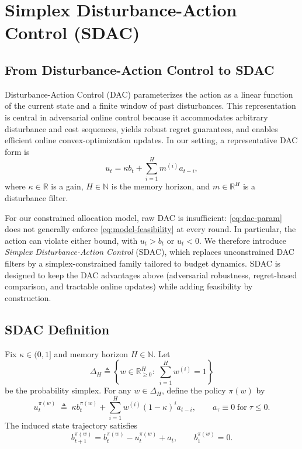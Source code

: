 \documentclass[11pt]{article}
\begin{document}
\section{Simplex Disturbance-Action Control (SDAC)}
\label{sec:sdac}

\subsection{From Disturbance-Action Control to SDAC}
Disturbance-Action Control (DAC) parameterizes the action as a linear function of the current state and a finite window of past disturbances. This representation is central in adversarial online control because it accommodates arbitrary disturbance and cost sequences, yields robust regret guarantees, and enables efficient online convex-optimization updates. In our setting, a representative DAC form is
\begin{equation}
\label{eq:dac-param}
u_t = \kappa b_t + \sum_{i=1}^{H} m^{(i)} a_{t-i},
\end{equation}
where $\kappa\in\mathbb{R}$ is a gain, $H\in\mathbb{N}$ is the memory horizon, and $m\in\mathbb{R}^H$ is a disturbance filter.

For our constrained allocation model, raw DAC is insufficient: \eqref{eq:dac-param} does not generally enforce \eqref{eq:model-feasibility} at every round. In particular, the action can violate either bound, with $u_t>b_t$ or $u_t<0$. We therefore introduce \emph{Simplex Disturbance-Action Control} (SDAC), which replaces unconstrained DAC filters by a simplex-constrained family tailored to budget dynamics. SDAC is designed to keep the DAC advantages above (adversarial robustness, regret-based comparison, and tractable online updates) while adding feasibility by construction.


\subsection{SDAC Definition}
Fix $\kappa\in(0,1]$ and memory horizon $H\in\mathbb{N}$. Let
\begin{equation}
\label{eq:def-simplex}
\Delta_H \triangleq \left\{w\in\mathbb{R}_{\ge 0}^H:\; \sum_{i=1}^H w^{(i)}=1\right\}
\end{equation}
be the probability simplex. For any $w\in\Delta_H$, define the policy $\pi(w)$ by
\begin{equation}
\label{eq:def-sdac-policy}
u_t^{\pi(w)} \;\triangleq\; \kappa b_t^{\pi(w)} + \sum_{i=1}^{H} w^{(i)}(1-\kappa)^i a_{t-i},
\qquad a_\tau\equiv 0\;\text{for}\;\tau\le 0.
\end{equation}
The induced state trajectory satisfies
\begin{equation}
\label{eq:sdac-state-update}
b_{t+1}^{\pi(w)} = b_t^{\pi(w)} - u_t^{\pi(w)} + a_t,
\qquad b_1^{\pi(w)}=0.
\end{equation}
\end{document}
